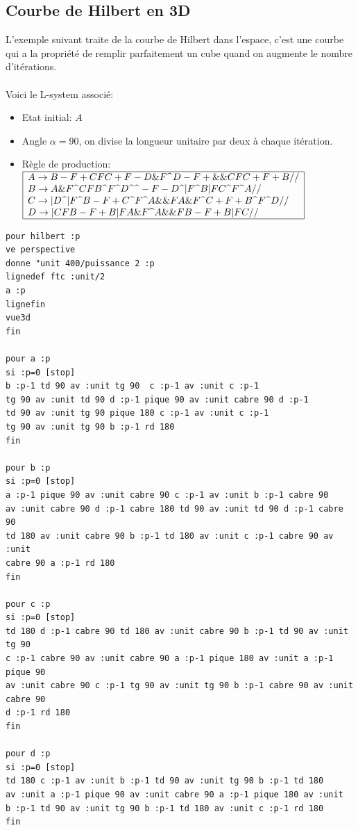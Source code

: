 \subsection{Courbe de Hilbert en 3D}
\noindent L'exemple suivant traite de la courbe de Hilbert dans l'espace, c'est une courbe qui a la propriété de remplir parfaitement un cube quand on augmente le nombre d'itérations.\\ \\
Voici le L-system associé:
\begin{itemize}
 \item Etat initial: $A$
 \item Angle $\alpha=90$\degre, on divise la longueur unitaire par deux à chaque itération.\\
 \item Règle de production: $\begin{array}{|l|}
\hline
A\rightarrow B-F+CFC+F-D\&F \textrm{\textrm{\textasciicircum}} D-F+\&\&CFC+F+B// \\
B\rightarrow A\&F\textrm{\textrm{\textasciicircum}} CFB\textrm{\textasciicircum} F \textrm{\textasciicircum} D\textrm{\textasciicircum} \textrm{\textasciicircum}-F-D\textrm{\textasciicircum}|F\textrm{\textasciicircum} B|FC\textrm{\textasciicircum} F\textrm{\textasciicircum} A// \\
C\rightarrow|D\textrm{\textasciicircum}|F\textrm{\textasciicircum} B-F+C\textrm{\textasciicircum} F\textrm{\textasciicircum} A\&\&FA\&F\textrm{\textasciicircum} C+F+B\textrm{\textasciicircum} F\textrm{\textasciicircum} D// \\
D\rightarrow|CFB-F+B|FA\&F\textrm{\textasciicircum} A\&\&FB-F+B|FC// \\
\hline
\end{array}$
\end{itemize}
\begin{verbatim}
pour hilbert :p
ve perspective
donne "unit 400/puissance 2 :p
lignedef ftc :unit/2
a :p
lignefin
vue3d
fin

pour a :p
si :p=0 [stop]
b :p-1 td 90 av :unit tg 90  c :p-1 av :unit c :p-1
tg 90 av :unit td 90 d :p-1 pique 90 av :unit cabre 90 d :p-1
td 90 av :unit tg 90 pique 180 c :p-1 av :unit c :p-1
tg 90 av :unit tg 90 b :p-1 rd 180
fin

pour b :p
si :p=0 [stop]
a :p-1 pique 90 av :unit cabre 90 c :p-1 av :unit b :p-1 cabre 90 
av :unit cabre 90 d :p-1 cabre 180 td 90 av :unit td 90 d :p-1 cabre 90 
td 180 av :unit cabre 90 b :p-1 td 180 av :unit c :p-1 cabre 90 av :unit 
cabre 90 a :p-1 rd 180 
fin

pour c :p
si :p=0 [stop]
td 180 d :p-1 cabre 90 td 180 av :unit cabre 90 b :p-1 td 90 av :unit tg 90 
c :p-1 cabre 90 av :unit cabre 90 a :p-1 pique 180 av :unit a :p-1 pique 90 
av :unit cabre 90 c :p-1 tg 90 av :unit tg 90 b :p-1 cabre 90 av :unit cabre 90 
d :p-1 rd 180 
fin

pour d :p
si :p=0 [stop]
td 180 c :p-1 av :unit b :p-1 td 90 av :unit tg 90 b :p-1 td 180
av :unit a :p-1 pique 90 av :unit cabre 90 a :p-1 pique 180 av :unit
b :p-1 td 90 av :unit tg 90 b :p-1 td 180 av :unit c :p-1 rd 180
fin
\end{verbatim}
